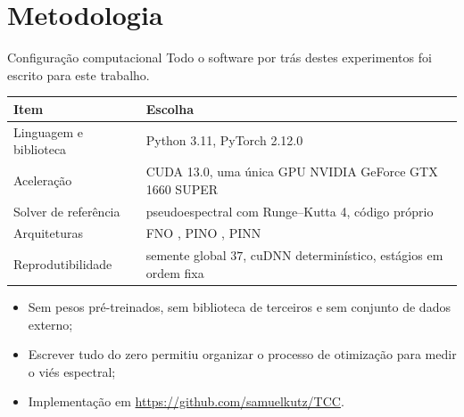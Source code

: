 \section{Metodologia}

\begin{frame}{Configuração computacional}
  Todo o software por trás destes experimentos foi escrito para este trabalho.
  \vspace{4pt}
  \begin{center}
    \small
    \begin{tabular}{@{}lp{9.2cm}@{}}
      \toprule
      \textbf{Item} & \textbf{Escolha} \\
      \midrule
      Linguagem e biblioteca & Python 3.11, PyTorch 2.12.0 \parencite{paszke2019pytorch} \\
      Aceleração             & CUDA 13.0, uma única GPU NVIDIA GeForce GTX 1660 SUPER \\
      Solver de referência   & pseudoespectral com Runge--Kutta 4, código próprio \\
      Arquiteturas           & FNO \parencite{li2021}, PINO \parencite{li2023pino}, PINN \parencite{raissi2019} \\
      Reprodutibilidade      & semente global $37$, cuDNN determinístico, estágios em ordem fixa \\
      \bottomrule
    \end{tabular}
  \end{center}
  \vspace{2pt}
  \begin{itemize}[<+->]
    \item Sem pesos pré-treinados, sem biblioteca de terceiros e sem conjunto de
          dados externo;
    \item Escrever tudo do zero permitiu organizar o processo de otimização para
          medir o viés espectral;
    \item Implementação em \url{https://github.com/samuelkutz/TCC}.
  \end{itemize}
\end{frame}

